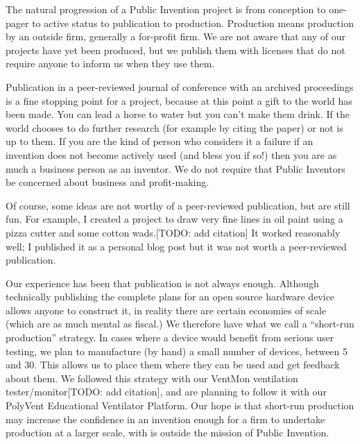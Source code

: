 \documentclass[
	fontsize=10pt, %
	twoside=false, %
	secnumdepth=1, %
]{kaobook}
\begin{document}
The natural progression of a Public Invention project is
from conception to one-pager to active status to publication
to production. Production means production by an outside firm, generally
a for-profit firm. We are not aware that any of our projects
have yet been produced, but we publish them with licenses that
do not require anyone to inform us when they use them.

Publication in a peer-reviewed journal of conference with an
archived proceedings is a fine stopping point for a project,
because at this point a gift to the world has been made.
You can lead a horse to water but you can't make them drink.
If the world chooses to do further research (for example by citing
the paper) or not is up to them. If you are the kind of
person who considers it a failure if an invention does not
become actively used (and bless you if so!) then you are
as much a business person as an inventor. We do not require
that Public Inventors be concerned about business and profit-making.

Of course, some ideas are not worthy of a peer-reviewed publication,
but are still fun. For example, I created a project to draw very fine
lines in oil paint using a pizza cutter and some cotton wads.[TODO: add citation]
It worked reasonably well; I published it as a personal blog post
but it was not worth a peer-reviewed publication.

Our experience has been that publication is not always enough.
Although technically publishing the complete plans for an open source
hardware device allows anyone to construct it, in reality there
are certain economies of scale (which are as much mental as fiscal.)
We therefore have what we call a ``short-run production'' strategy.
In cases where a device would benefit from serious user testing,
we plan to manufacture (by hand) a small number of devices, between
5 and 30. This allows us to place them where they can be used and
get feedback about them. We followed this strategy with our VentMon
ventilation tester/monitor[TODO: add citation], and are planning to follow it with our
PolyVent Educational Ventilator Platform.
Our hope is that short-run production may increase the confidence
in an invention enough for a firm to undertake production at a larger scale,
with is outside the mission of Public Invention.
\end{document}
